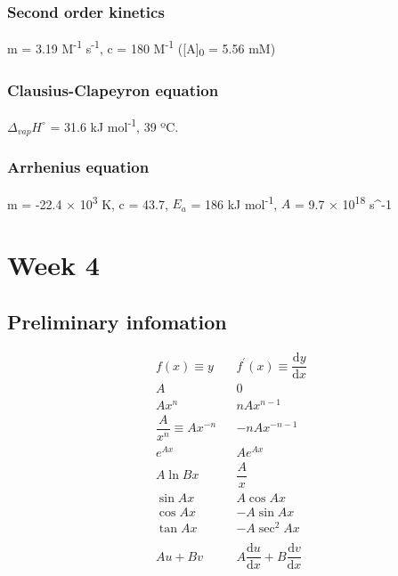 \documentclass[
]{book}
\begin{document}
\hypertarget{subsec:2ndkinteticsans}{%
\subsection{Second order kinetics}\label{subsec:2ndkinteticsans}}

m = 3.19 M\textsuperscript{-1} s\textsuperscript{-1}, c = 180 M\textsuperscript{-1} ({[}A{]}\textsubscript{0} = 5.56 mM)

\hypertarget{subsec:clausiusans}{%
\subsection{Clausius-Clapeyron equation}\label{subsec:clausiusans}}

\(\Delta _{vap}H^\circ\) = 31.6 kJ mol\textsuperscript{-1}, 39 ºC.

\hypertarget{subsec:arrheniusans}{%
\subsection{Arrhenius equation}\label{subsec:arrheniusans}}

m = -22.4 × 10\textsuperscript{3} K, c = 43.7, \(E_a\) = 186 kJ mol\textsuperscript{-1}, \(A\) = 9.7 × 10\textsuperscript{18} s\^{}-1

\hypertarget{ch:Workshop4}{%
\chapter{Week 4}\label{ch:Workshop4}}

\hypertarget{sec:Prelim4}{%
\section{Preliminary infomation}\label{sec:Prelim4}}

\begin{equation*}
\begin{array}{ccc}
  f(x) \equiv y & & f^{\prime}(x) \equiv \dfrac{\textrm{d}y}{\textrm{d}x}\\
  \hline
A & &0 \\
 Ax^n & &nAx^{n-1} \\
 \dfrac{A}{x^n} \equiv A x^{-n} & &-nA x^{-n-1} \\
e^{Ax} & &Ae^{Ax} \\
A \ln Bx & &\dfrac{A}{x} \\
\sin Ax & &A\cos Ax \\
\cos Ax & &-A\sin Ax \\
\tan Ax & &-A\sec^2 Ax \\
\\
Au + Bv & &A\dfrac{\textrm{d}u}{\textrm{d}x} + B\dfrac{\textrm{d}v}{\textrm{d}x} \\
\end{array}
\end{equation*}
\end{document}
